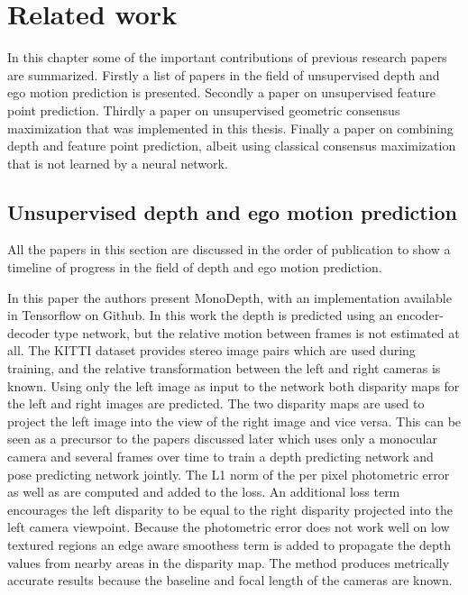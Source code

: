 \chapter{Related work}\label{cha:relatedwork}


In this chapter some of the important contributions of previous research papers are summarized. Firstly a list of papers in the field of unsupervised depth and ego motion prediction is presented. Secondly a paper on unsupervised feature point prediction. Thirdly a paper on unsupervised geometric consensus maximization that was implemented in this thesis. Finally a paper on combining depth and feature point prediction, albeit using classical consensus maximization that is not learned by a neural network.

\section{Unsupervised depth and ego motion prediction}
\label{sec:rldepth}

All the papers in this section are discussed in the order of publication to show a timeline of progress in the field of depth and ego motion prediction.


In this paper\cite{leftright} the authors present MonoDepth, with an implementation available in Tensorflow on Github. In this work the depth is predicted using an encoder-decoder type network, but the relative motion between frames is not estimated at all. The KITTI dataset provides stereo image pairs which are used during training, and the relative transformation between the left and right cameras is known. Using only the left image as input to the network both disparity maps for the left and right images are predicted. The two disparity maps are used to project the left image into the view of the right image and vice versa. This can be seen as a precursor to the papers discussed later which uses only a monocular camera and several frames over time to train a depth predicting network and pose predicting network jointly. The L1 norm of the per pixel photometric error as well as \abbrSSIM\cite{ssim} are computed and added to the loss. An additional loss term encourages the left disparity to be equal to the right disparity projected into the left camera viewpoint. Because the photometric error does not work well on low textured regions an edge aware smoothess term is added to propagate the depth values from nearby areas in the disparity map. The method produces metrically accurate results because the baseline and focal length of the cameras are known.

